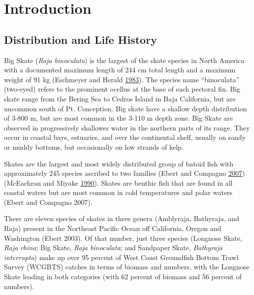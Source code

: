 \documentclass[12pt,]{article}
\begin{document}
\FloatBarrier

\newpage
\renewcommand{\thefigure}{\arabic{figure}}
\renewcommand{\thetable}{\arabic{table}}
\setcounter{figure}{0}
\setcounter{table}{0}

\newpage
\renewcommand{\thefigure}{\arabic{figure}}
\renewcommand{\thetable}{\arabic{table}}
\setcounter{figure}{0}
\setcounter{table}{0}

\hypertarget{introduction}{%
\section{Introduction}\label{introduction}}

\hypertarget{distribution-and-life-history}{%
\subsection{Distribution and Life
History}\label{distribution-and-life-history}}

Big Skate (\emph{Raja binoculata}) is the largest of the skate species
in North America with a documented maximum length of 244 cm total length
and a maximum weight of 91 kg (Eschmeyer and Herald
\protect\hyperlink{ref-Eschmeyer1983}{1983}). The species name
``binoculata'' (two-eyed) refers to the prominent ocellus at the base of
each pectoral fin. Big skate range from the Bering Sea to Cedros Island
in Baja California, but are uncommon south of Pt. Conception. Big skate
have a shallow depth distribution of 3-800 m, but are most common in the
3-110 m depth zone. Big Skate are observed in progressively shallower
water in the northern parts of its range. They occur in coastal bays,
estuaries, and over the continental shelf, usually on sandy or muddy
bottoms, but occasionally on low strands of kelp.

Skates are the largest and most widely distributed group of batoid fish
with approximately 245 species ascribed to two families (Ebert and
Compagno \protect\hyperlink{ref-Ebert2007biodiversity}{2007})(McEachran
and Miyake \protect\hyperlink{ref-McEachran1990}{1990}). Skates are
benthic fish that are found in all coastal waters but are most common in
cold temperatures and polar waters (Ebert and Compagno 2007).

There are eleven species of skates in three genera (Amblyraja,
Bathyraja, and Raja) present in the Northeast Pacific Ocean off
California, Oregon and Washington (Ebert 2003). Of that number, just
three species (Longnose Skate, \emph{Raja rhina}; Big Skate, \emph{Raja
binoculata}; and Sandpaper Skate, \emph{Bathyraja interrupta}) make up
over 95 percent of West Coast Groundfish Bottom Trawl Survey (WCGBTS)
catches in terms of biomass and numbers, with the Longnose Skate leading
in both categories (with 62 percent of biomass and 56 percent of
numbers).
\end{document}
